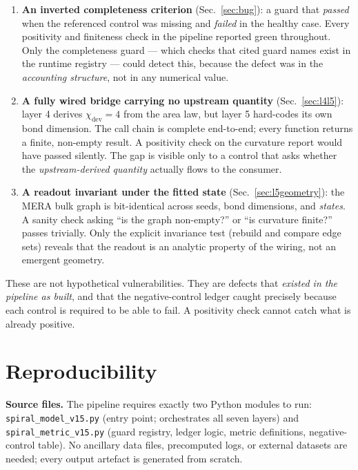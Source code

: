 \documentclass[11pt,a4paper]{article}
\newcommand{\code}[1]{\texttt{\small #1}}
\begin{document}
\begin{enumerate}[leftmargin=1.4em,itemsep=3pt]
  \item \textbf{An inverted completeness criterion} (Sec.~\ref{sec:bug}): a guard
        that \emph{passed} when the referenced control was missing and
        \emph{failed} in the healthy case. Every positivity and finiteness check
        in the pipeline reported green throughout. Only the completeness guard ---
        which checks that cited guard names exist in the runtime registry ---
        could detect this, because the defect was in the \emph{accounting
        structure}, not in any numerical value.
  \item \textbf{A fully wired bridge carrying no upstream quantity}
        (Sec.~\ref{sec:l4l5}): layer 4 derives $\chi_{\text{dev}}=4$ from the
        area law, but layer 5 hard-codes its own bond dimension. The call chain
        is complete end-to-end; every function returns a finite, non-empty
        result. A positivity check on the curvature report would have passed
        silently. The gap is visible only to a control that asks whether the
        \emph{upstream-derived quantity} actually flows to the consumer.
  \item \textbf{A readout invariant under the fitted state}
        (Sec.~\ref{sec:l5geometry}): the MERA bulk graph is bit-identical across
        seeds, bond dimensions, and \emph{states}. A sanity check asking
        ``is the graph non-empty?'' or ``is curvature finite?'' passes
        trivially. Only the explicit invariance test (rebuild and compare edge
        sets) reveals that the readout is an analytic property of the wiring,
        not an emergent geometry.
\end{enumerate}

\noindent These are not hypothetical vulnerabilities. They are defects that
\emph{existed in the pipeline as built}, and that the negative-control ledger
caught precisely because each control is required to be able to fail. A
positivity check cannot catch what is already positive.

\section{Reproducibility}
\label{sec:repro}

\textbf{Source files.} The pipeline requires exactly two Python modules to run:
\code{spiral\_model\_v15.py} (entry point; orchestrates all seven layers) and
\code{spiral\_metric\_v15.py} (guard registry, ledger logic, metric definitions,
negative-control table). No ancillary data files, precomputed logs, or external
datasets are needed; every output artefact is generated from scratch.
\end{document}

